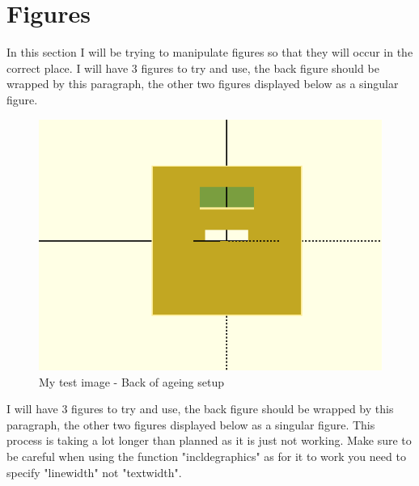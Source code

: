 \documentclass[a4paper,11pt]{report}
\begin{document}
 \section{Figures}
\label{sec2}
In this section I will be trying to manipulate figures so that they will occur in the correct place. I will have 3 figures to try and use, the back figure should be wrapped by this paragraph, the other two figures displayed below as a singular figure.
\begin{figure}
\includegraphics[width=1\linewidth]{Back}
\caption{My test image - Back of ageing setup}
\end{figure}\noindent I will have 3 figures to try and use, the back figure should be wrapped by this paragraph, the other two figures displayed below as a singular figure. This process is taking a lot longer than planned as it is just not working. Make sure to be careful when using the function "incldegraphics" as for it to work you need to specify "linewidth" not "textwidth".
  \\
  \\
  \\
  \\
\end{document}
